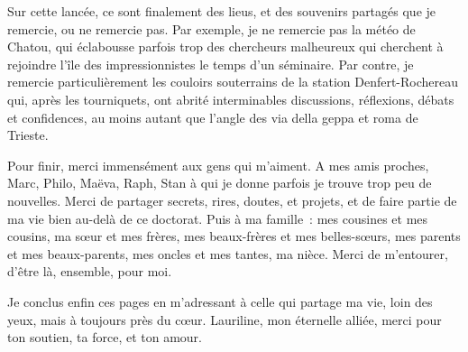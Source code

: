 \documentclass[a4paper]{book}
\begin{document}


Sur cette lancée, ce sont finalement des lieus, et des souvenirs partagés que je remercie, ou ne remercie pas.
Par exemple, je ne remercie pas la météo de Chatou, 
qui éclabousse parfois trop des chercheurs malheureux qui cherchent à rejoindre l'île des impressionnistes le temps d'un séminaire.
Par contre, je remercie particulièrement les couloirs souterrains de la station Denfert-Rochereau qui, après les tourniquets, ont abrité interminables discussions, réflexions, débats et confidences, au moins autant que l'angle des via della geppa et roma de Trieste.




Pour finir, merci immensément aux gens qui m'aiment. 
A mes amis proches, Marc, Philo, Maëva, Raph, Stan à qui je donne parfois je trouve trop peu de nouvelles. 
Merci de partager secrets, rires, doutes, et projets, et de faire partie de ma vie bien au-delà de ce doctorat.
Puis à ma famille~: mes cousines et mes cousins, ma sœur et mes frères, mes beaux-frères et mes belles-sœurs, mes parents et mes beaux-parents, mes oncles et mes tantes, ma nièce.
Merci de m'entourer, d'être là, ensemble, pour moi. %


Je conclus enfin ces pages en m'adressant à celle qui partage ma vie, loin des yeux, mais à toujours près du cœur. Lauriline, mon éternelle alliée, merci pour ton soutien, ta force, et ton amour.




\end{document}
